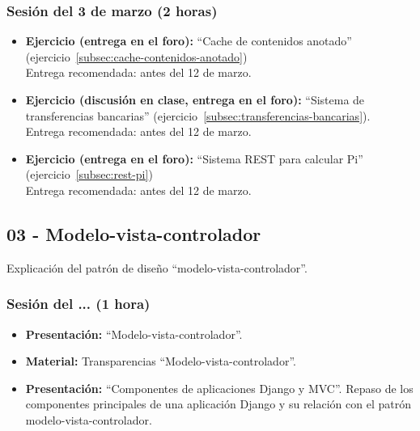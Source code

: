 \documentclass[a4paper,12pt]{article}
\begin{document}
\subsubsection{Sesión del 3 de marzo (2 horas)}

\begin{itemize}
\item \textbf{Ejercicio (entrega en el foro):} ``Cache de contenidos anotado'' (ejercicio~\ref{subsec:cache-contenidos-anotado}) \\
  Entrega recomendada: antes del 12 de marzo.
\item \textbf{Ejercicio (discusión en clase, entrega en el foro):} ``Sistema de transferencias bancarias'' (ejercicio~\ref{subsec:transferencias-bancarias}). \\
Entrega recomendada: antes del 12 de marzo.
\item \textbf{Ejercicio (entrega en el foro):} ``Sistema REST para calcular Pi'' (ejercicio~\ref{subsec:rest-pi}) \\
Entrega recomendada: antes del 12 de marzo.
\end{itemize}


\subsection{03 - Modelo-vista-controlador}

Explicación del patrón de diseño ``modelo-vista-controlador''.

\subsubsection{Sesión del ... (1 hora)}

\begin{itemize}
\item \textbf{Presentación:} ``Modelo-vista-controlador''.
\item \textbf{Material:} Transparencias ``Modelo-vista-controlador''.
\item \textbf{Presentación:} ``Componentes de aplicaciones Django y MVC''.
 Repaso de los componentes principales de una aplicación Django y su relación con el patrón modelo-vista-controlador.
\end{itemize}
\end{document}
